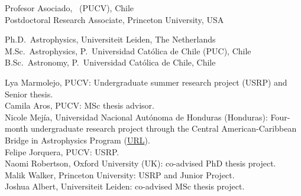 \documentclass[11pt]{article}
\begin{document}

\noindent
{} Profesor Asociado, \pucv\ (PUCV), Chile\\
 Postdoctoral Research Associate, Princeton University, USA



\noindent
{} Ph.D.~Astrophysics, Universiteit Leiden, The Netherlands\\
 M.Sc.~Astrophysics, P.~Universidad Cat\'olica de Chile (PUC), Chile\\
 B.Sc.~Astronomy, P.~Universidad Cat\'olica de Chile, Chile\\







\noindent
{} Lya Marmolejo, PUCV: Undergraduate summer research project (USRP) and Senior thesis.\\
 Camila Aros, PUCV: MSc thesis advisor.\\
 Nicole Mej\'ia, Universidad Nacional Aut\'onoma de Honduras (Honduras): Four-month undergraduate
    research project through the Central American-Caribbean Bridge in Astrophysics Program
    (\href{https://cencabridgeastro.weebly.com/our-team.html}{URL}).\\
 Felipe Jorquera, PUCV: USRP.\\
 Naomi Robertson, Oxford University (UK): co-advised PhD thesis project.\\
 Malik Walker, Princeton University: USRP and Junior Project.\\
 Joshua Albert, Universiteit Leiden: co-advised MSc thesis project. 


\end{document}
